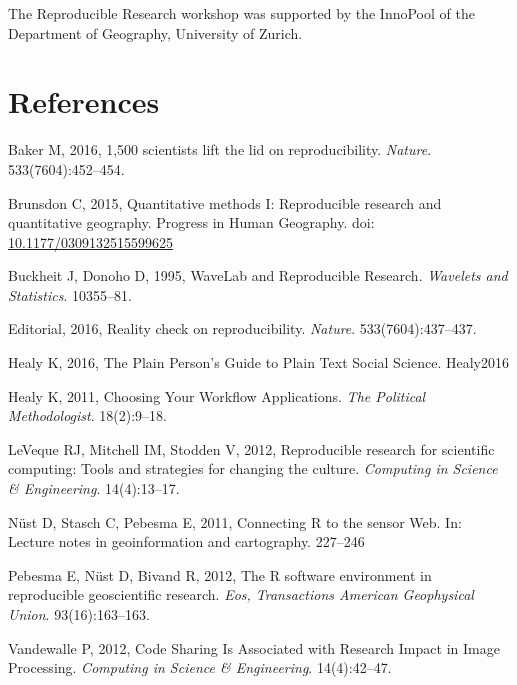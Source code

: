 \documentclass[]{article}
\begin{document}
The Reproducible Research workshop was supported by the InnoPool of the
Department of Geography, University of Zurich.

\section*{References}\label{references}

\hypertarget{refs}{}
\hypertarget{ref-Baker2016}{}
Baker M, 2016, 1,500 scientists lift the lid on reproducibility.
\emph{Nature}. 533(7604):452--454.

\hypertarget{ref-Brunsdon2015}{}
Brunsdon C, 2015, Quantitative methods I: Reproducible research and
quantitative geography. Progress in Human Geography. doi:
\href{https://doi.org/10.1177/0309132515599625}{10.1177/0309132515599625}

\hypertarget{ref-Buckheit1995}{}
Buckheit J, Donoho D, 1995, WaveLab and Reproducible Research.
\emph{Wavelets and Statistics}. 10355--81.

\hypertarget{ref-Nature2016}{}
Editorial, 2016, Reality check on reproducibility. \emph{Nature}.
533(7604):437--437.

\hypertarget{ref-Healy2016}{}
Healy K, 2016, The Plain Person's Guide to Plain Text Social Science.
Healy2016

\hypertarget{ref-Healy2011}{}
Healy K, 2011, Choosing Your Workflow Applications. \emph{The Political
Methodologist}. 18(2):9--18.

\hypertarget{ref-Leveque2012}{}
LeVeque RJ, Mitchell IM, Stodden V, 2012, Reproducible research for
scientific computing: Tools and strategies for changing the culture.
\emph{Computing in Science \& Engineering}. 14(4):13--17.

\hypertarget{ref-Nuest2011}{}
Nüst D, Stasch C, Pebesma E, 2011, Connecting R to the sensor Web. In:
Lecture notes in geoinformation and cartography. 227--246

\hypertarget{ref-Pebesma2012}{}
Pebesma E, Nüst D, Bivand R, 2012, The R software environment in
reproducible geoscientific research. \emph{Eos, Transactions American
Geophysical Union}. 93(16):163--163.

\hypertarget{ref-Vandewalle2012}{}
Vandewalle P, 2012, Code Sharing Is Associated with Research Impact in
Image Processing. \emph{Computing in Science \& Engineering}.
14(4):42--47.
\end{document}
